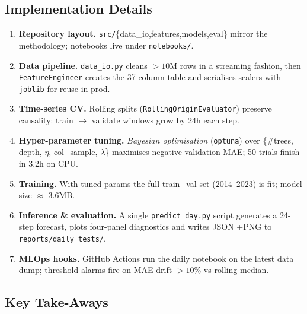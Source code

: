 \subsection{Implementation Details}
\label{subsec:impl}

\begin{enumerate}
\item \textbf{Repository layout.}  
      \texttt{src/}\{data\_io,features,models,eval\} mirror the
      methodology; notebooks live under \texttt{notebooks/}.
\item \textbf{Data pipeline.}  
      \texttt{data\_io.py} cleans $>10$M rows in a
      streaming fashion, then \texttt{FeatureEngineer} creates the
      37-column table and serialises scalers with
      \texttt{joblib} for reuse in prod.
\item \textbf{Time-series CV.}  
      Rolling splits (\texttt{RollingOriginEvaluator}) preserve causality:
      train $\to$ validate windows grow by 24h each step.
\item \textbf{Hyper-parameter tuning.}  
      \emph{Bayesian optimisation} (\texttt{optuna}) over
      \{\#trees, depth, $\eta$, col\_sample, $\lambda$\} maximises
      negative validation MAE; 50 trials finish in 3.2h on CPU.
\item \textbf{Training.}  
      With tuned params the full train+val set (2014–2023) is fit; model
      size $\approx$ 3.6MB.
\item \textbf{Inference \& evaluation.}  
      A single \texttt{predict\_day.py} script generates a
      24-step forecast, plots four-panel diagnostics and writes
      JSON +\;PNG to \texttt{reports/daily\_tests/}.
\item \textbf{MLOps hooks.}  
      GitHub Actions run the daily notebook on the latest data dump;
      threshold alarms fire on MAE drift $>10\%$ vs rolling median.
\end{enumerate}

\subsection{Key Take-Aways}
\label{subsec:key-takeaways}


